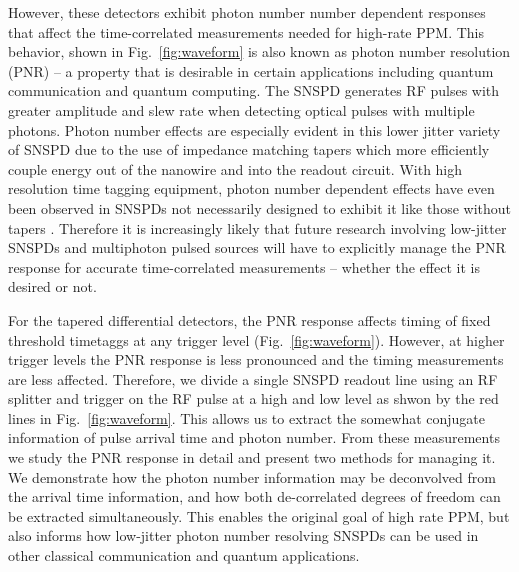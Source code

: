 \documentclass[11pt]{caltech_thesis} %
\begin{document}
However, these detectors exhibit photon number number dependent
responses that affect the time-correlated measurements needed for
high-rate PPM. This behavior, shown in Fig.~\ref{fig:waveform} is also
known as photon number resolution (PNR) -- a property that is desirable
in certain applications including quantum communication and quantum
computing. The SNSPD generates RF pulses with greater amplitude and slew
rate when detecting optical pulses with multiple photons. Photon number
effects are especially evident in this lower jitter variety of SNSPD due
to the use of impedance matching tapers which more efficiently couple
energy out of the nanowire and into the readout circuit. With high
resolution time tagging equipment, photon number dependent effects have
even been observed in SNSPDs not necessarily designed to exhibit it
\autocite[\textcite{sauer2023resolving}]{schapeler2023superconducting}
like those without tapers \autocite{Cahall2017SlewRatePNR}. Therefore it
is increasingly likely that future research involving low-jitter SNSPDs
and multiphoton pulsed sources will have to explicitly manage the PNR
response for accurate time-correlated measurements -- whether the effect
it is desired or not.

For the tapered differential detectors, the PNR response affects timing
of fixed threshold timetaggs at any trigger level
(Fig.~\ref{fig:waveform}). However, at higher trigger levels the PNR
response is less pronounced and the timing measurements are less
affected. Therefore, we divide a single SNSPD readout line using an RF
splitter and trigger on the RF pulse at a high and low level as shwon by
the red lines in Fig.~\ref{fig:waveform}. This allows us to extract the
somewhat conjugate information of pulse arrival time and photon number.
From these measurements we study the PNR response in detail and present
two methods for managing it. We demonstrate how the photon number
information may be deconvolved from the arrival time information, and
how both de-correlated degrees of freedom can be extracted
simultaneously. This enables the original goal of high rate PPM, but
also informs how low-jitter photon number resolving SNSPDs can be used
in other classical communication and quantum applications.
\end{document}
